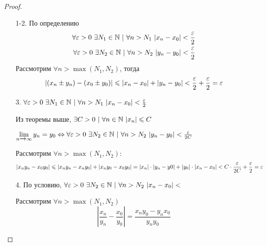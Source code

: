 \begin{proof}
\begin{enumerate}
    \item[1-2.] 
    По определению
    \begin{align*}
        \forall \eps > 0\ \exists N_1 \in \N\ |\ \forall n > N_1\ |x_n - x_0| < \frac{\eps}{2}
        \\
        \forall \eps > 0\ \exists N_2 \in \N\ |\ \forall n > N_2\ |y_n - y_0| < \frac{\eps}{2}
    \end{align*}
    Рассмотрим $\forall n > \max(N_1, N_2)$, тогда
    $$
        |(x_n \pm y_n) - (x_0 \pm y_0)| \leqslant |x_n - x_0| + |y_n - y_0| < \frac{\varepsilon}{2} + \frac{\varepsilon}{2} = \varepsilon
    $$
    \item[3.] 
    $\forall \varepsilon > 0\ \exists N_1 \in \mathbb{N}\ |\ \forall n > N_1\ |x_n - x_0| < \frac{\varepsilon}{2}$
    
    Из теоремы выше, $\exists C > 0\ |\ \forall n \in \N\ |x_n| \le C$
    
    $\liml_{n \xrightarrow{} \infty} y_n = y_0 \lra \forall \eps > 0\ \exists N_2 \in \N\ |\ \forall n > N_2\ |y_n - y_0| < \frac{\eps}{2C}$
    
    Рассмотрим $\forall n > \max(N_1, N_2)$:
    $$
        |x_n y_n - x_0 y_0| \leqslant |x_n y_n - x_n y_0| + |x_n y_0 - x_0 y_0| = |x_n| \cdot |y_n - y0| + |y_0| \cdot |x_n - x_0| < C \cdot \frac{\varepsilon}{2C} + \frac{\varepsilon}{2} = \varepsilon
    $$
    \item[4.]
    По условию, $\forall \varepsilon > 0\ \exists N_2 \in \mathbb{N}\ |\ \forall n > N_2\ |x_n - x_0| < $
    
    Рассмотрим $\forall n > \max(N_1, N_2)$
    $$
        \left|\frac{x_n}{y_n} - \frac{x_0}{y_0}\right| = \frac{x_n y_0 - y_n x_0}{y_n y_0}
    $$
\end{enumerate}
\end{proof}